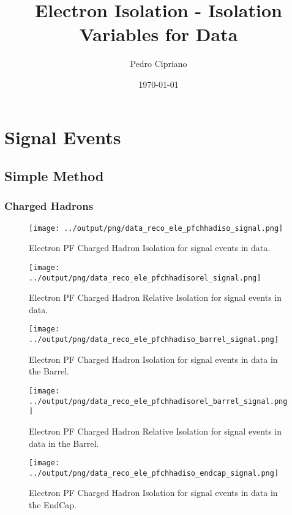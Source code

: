 \documentclass[11pt]{book}
\begin{document}
         
 
 \author{Pedro Cipriano}
 \date{\today}
 \title{Electron Isolation - Isolation Variables for Data}

\maketitle

\tableofcontents

\chapter{Signal Events}
\section{Simple Method}
\subsection{Charged Hadrons}
\begin{figure}[htb]
\centering
\texttt{[image: ../output/png/data\_reco\_ele\_pfchhadiso\_signal.png]}
\caption{Electron PF Charged Hadron Isolation for signal events in data.}
\label{fig:data_ele_pfchhadiso_signal}
\end{figure}

\begin{figure}[htb]
\centering
\texttt{[image: ../output/png/data\_reco\_ele\_pfchhadisorel\_signal.png]}
\caption{Electron PF Charged Hadron Relative Isolation for signal events in data.}
\label{fig:data_ele_pfchhadisorel_signal}
\end{figure}

\begin{figure}[htb]
\centering
\texttt{[image: ../output/png/data\_reco\_ele\_pfchhadiso\_barrel\_signal.png]}
\caption{Electron PF Charged Hadron Isolation for signal events in data in the Barrel.}
\label{fig:data_ele_pfchhadiso_barrel_signal}
\end{figure}

\begin{figure}[htb]
\centering
\texttt{[image: ../output/png/data\_reco\_ele\_pfchhadisorel\_barrel\_signal.png]}
\caption{Electron PF Charged Hadron Relative Isolation for signal events in data in the Barrel.}
\label{fig:data_ele_pfchhadisorel_barrel_signal}
\end{figure}

\begin{figure}[htb]
\centering
\texttt{[image: ../output/png/data\_reco\_ele\_pfchhadiso\_endcap\_signal.png]}
\caption{Electron PF Charged Hadron Isolation for signal events in data in the EndCap.}
\label{fig:data_ele_pfchhadiso_endcap_signal}
\end{figure}
\end{document}
